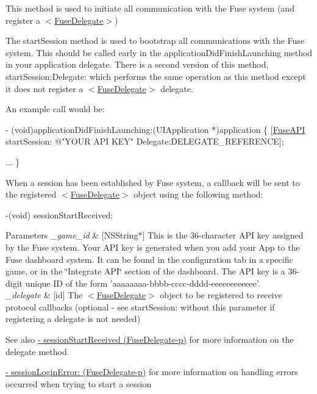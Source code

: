 This method is used to initiate all communication with the Fuse system (and register a $<$\hyperlink{protocol_fuse_delegate-p}{Fuse\+Delegate}$>$) 

The start\+Session method is used to bootstrap all communications with the Fuse system. This should be called early in the application\+Did\+Finish\+Launching method in your application delegate. There is a second version of this method, start\+Session\+:\+Delegate\+: which performs the same operation as this method except it does not register a $<$\hyperlink{protocol_fuse_delegate-p}{Fuse\+Delegate}$>$ delegate.

An example call would be\+:


\begin{DoxyCode}
- (void)applicationDidFinishLaunching:(UIApplication *)application
\{
[\hyperlink{interface_fuse_a_p_i}{FuseAPI} startSession: \textcolor{stringliteral}{@"YOUR API KEY"} Delegate:DELEGATE\_REFERENCE];

...
\}
\end{DoxyCode}


When a session has been established by Fuse system, a callback will be sent to the registered $<$\hyperlink{protocol_fuse_delegate-p}{Fuse\+Delegate}$>$ object using the following method\+:


\begin{DoxyCode}
-(void) sessionStartReceived;
\end{DoxyCode}



\begin{DoxyParams}{Parameters}
{\em \+\_\+game\+\_\+id} & \mbox{[}N\+S\+String$\ast$\mbox{]} This is the 36-\/character A\+P\+I key assigned by the Fuse system. Your A\+P\+I key is generated when you add your App to the Fuse dashboard system. It can be found in the configuration tab in a specific game, or in the \char`\"{}\+Integrate A\+P\+I\char`\"{} section of the dashboard. The A\+P\+I key is a 36-\/digit unique I\+D of the form 'aaaaaaaa-\/bbbb-\/cccc-\/dddd-\/eeeeeeeeeeee'. \\
\hline
{\em \+\_\+delegate} & \mbox{[}id\mbox{]} The $<$\hyperlink{protocol_fuse_delegate-p}{Fuse\+Delegate}$>$ object to be registered to receive protocol callbacks (optional -\/ see start\+Session\+: without this parameter if registering a delegate is not needed) \\
\hline
\end{DoxyParams}
\begin{DoxySeeAlso}{See also}
\hyperlink{protocol_fuse_delegate-p_a4278f68e73dc20a7a24b331959a1872c}{-\/ session\+Start\+Received (\+Fuse\+Delegate-\/p)} for more information on the delegate method 

\hyperlink{protocol_fuse_delegate-p_ada4bf22b446c79333c9fd15b39121603}{-\/ session\+Login\+Error\+: (\+Fuse\+Delegate-\/p)} for more information on handling errors occurred when trying to start a session 
\end{DoxySeeAlso}

